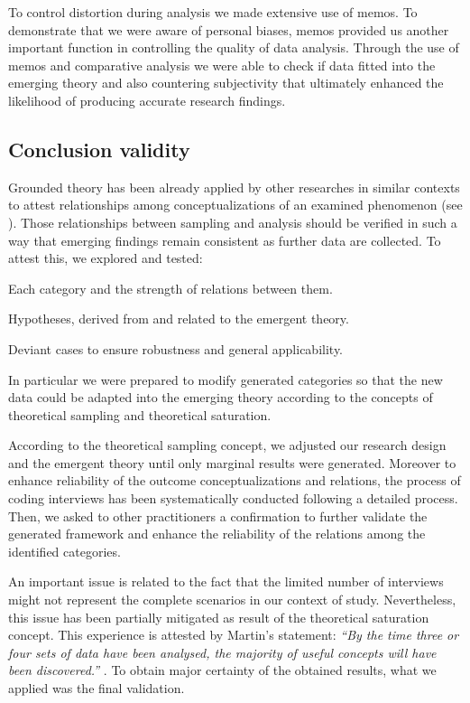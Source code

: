 \documentclass[10pt,journal,letterpaper,compsoc]{IEEEtran}
\begin{document}
To control distortion during analysis we made extensive use of memos. To
demonstrate that we were aware of personal biases, memos provided us another
important function in controlling the quality of data analysis. Through the use
of memos and comparative analysis we were able to check if data fitted into the
emerging theory and also countering subjectivity that ultimately enhanced the
likelihood of producing accurate research findings.

\subsection{Conclusion validity}

Grounded theory has been already applied by other researches in similar
contexts to attest relationships among conceptualizations of an examined
phenomenon (see \cite{Coleman2007, Basri, Coleman2008a}). Those relationships
between sampling and analysis should be verified in such a way that emerging
findings remain consistent as further data are collected. To attest this, we
explored and tested:

\begin{compactitem} 
  \item Each category and the strength of relations between them. 
  \item Hypotheses, derived from and related to the emergent theory. 
  \item Deviant cases to ensure robustness and general applicability. 
\end{compactitem}

In particular we were prepared to modify generated categories so that the new
data could be adapted into the emerging theory according to the concepts of
theoretical sampling and theoretical saturation.

According to the theoretical sampling concept, we adjusted our  research design
and the emergent theory until only marginal results were  generated. Moreover to
enhance reliability of the outcome conceptualizations and  relations, the
process of coding interviews has been systematically conducted  following a
detailed process. Then, we asked to other practitioners a  confirmation to
further validate the generated framework and enhance the  reliability of the
relations among the identified categories.

An important issue is related to the fact that the limited number of interviews
might not represent the complete scenarios in our context of study.
Nevertheless, this issue has been partially mitigated as result of the
theoretical saturation concept. This experience is attested by Martin's
statement: \textit{``By the time three or four sets of data have been analysed,
the majority of useful concepts will have been discovered.''}
\cite{giardinoEtAl}. To obtain major certainty of the obtained results, what we
applied was the final validation.
\end{document}
